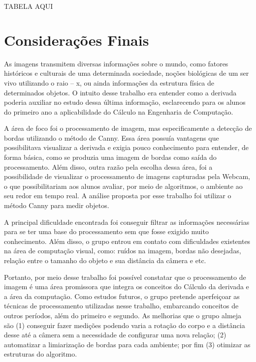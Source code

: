 \documentclass[12pt]{article}
\begin{document}
	TABELA AQUI
	
	\section{Considerações Finais}
	
	As imagens transmitem diversas informações sobre o mundo, como fatores históricos e culturais de uma determinada sociedade, noções biológicas de um ser vivo utilizando o raio – x, ou ainda informações da estrutura física de determinados objetos. O intuito desse trabalho era entender como a derivada poderia auxiliar no estudo dessa última informação, esclarecendo para os alunos do primeiro ano a aplicabilidade do Cálculo na Engenharia de Computação.
	
	A área de foco foi o processamento de imagem, mas especificamente a detecção de bordas utilizando o método de Canny. Essa área possuía vantagens que possibilitava visualizar a derivada e exigia pouco conhecimento para entender, de forma básica, como se produzia uma imagem de bordas como saída do processamento. Além disso, outra razão pela escolha dessa área, foi a possibilidade de visualizar o processamento de imagens capturadas pela Webcam, o que possibilitariam aos alunos avaliar, por meio de algoritmos, o ambiente ao seu redor em tempo real. A análise proposta por esse trabalho foi utilizar o método Canny para medir objetos. 
	
	A principal dificuldade encontrada foi conseguir filtrar as informações necessárias para se ter uma base do processamento sem que fosse exigido muito conhecimento. Além disso, o grupo entrou em contato com dificuldades existentes na área de computação visual, como: ruídos na imagem, bordas não desejadas, relação entre o tamanho do objeto e sua distância da câmera e etc.
	
	Portanto, por meio desse trabalho foi possível constatar que o processamento de imagem é uma área promissora que integra os conceitos do Cálculo da derivada e a área da computação. Como estudos futuros, o grupo pretende aperfeiçoar as técnicas de processamento utilizadas nesse trabalho, embarcando conceitos de outros períodos, além do primeiro e segundo. As melhorias que o grupo almeja são (1) conseguir fazer medições podendo varia a rotação do corpo e a distância desse até a câmera sem a necessidade de configurar uma nova relação; (2) automatizar a limiarização de bordas para cada ambiente; por fim (3) otimizar as estruturas do algoritmo.
	
	
	
	
	
	
\end{document}
